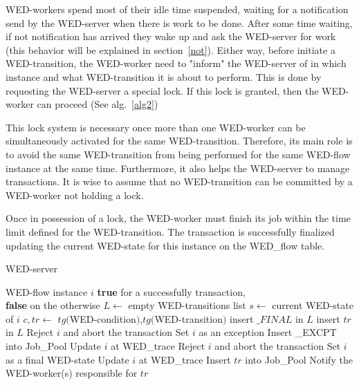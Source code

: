 \documentclass[12pt]{article}
\begin{document}
\par  WED-workers spend most of their idle time suspended, waiting for a notification send by the WED-server when there is work 
to be done. After some time waiting, if not notification has arrived they wake up and ask the WED-server for work (this
behavior will be explained in section~\ref{not}). Either way, before initiate a WED-transition, the WED-worker need to 
"inform" the WED-server of in which instance and what WED-transition it is about to perform. This is done by requesting the
WED-server a special lock. If this lock is granted, then the WED-worker can proceed (See alg.~\ref{alg2})

\par This lock system is necessary once more than one WED-worker can be simultaneously activated for the same WED-transition.
Therefore, its main role is to avoid the same WED-transition from being performed for the same WED-flow instance at the
same time. Furthermore, it also helps the WED-server to manage transactions. It is wise to assume that no WED-transition
can be committed by a WED-worker not holding a lock.

\par Once in possession of a lock, the WED-worker must finish its job within the time limit defined for the WED-transition.
The transaction is successfully finalized updating the current WED-state for this instance on the WED\_flow table.

\begin{algorithm}
\caption{WED-server}
\label{alg1}
\begin{algorithmic}[1]
\REQUIRE WED-flow instance $i$
\ENSURE \textbf{true} for a successfully transaction,\\
         \hspace{23pt}\textbf{false} on the otherwise
\STATE $L \leftarrow$ empty WED-transitions list 
\STATE $s \leftarrow$ current WED-state of $i$
\STATE $c,tr \leftarrow$ $tg($WED-condition$)$,$tg($WED-transition$)$
\STATE insert $\_FINAL$ in $L$
\ELSE
\STATE insert $tr$ in $L$
\ENDIF
\ENDIF
\ENDFOR
{}
\STATE Reject $i$ and abort the transaction
\RETURN \FALSE
{}
\STATE Set $i$ as an exception
\STATE Insert \_EXCPT into Job\_Pool
\ENDIF
\STATE Update $i$ at WED\_trace
\RETURN \TRUE
{}
\STATE Reject $i$ and abort the transaction
\RETURN \FALSE
\ELSE
\STATE Set $i$ as a final WED-state
\STATE Update $i$ at WED\_trace
\RETURN \TRUE
\ENDIF
\ELSE
{}
\STATE Insert $tr$ into Job\_Pool
\STATE Notify the WED-worker(s) responsible for $tr$
\RETURN \TRUE
\ENDFOR
\ENDIF

\end{algorithmic}
\end{algorithm}
\end{document}
